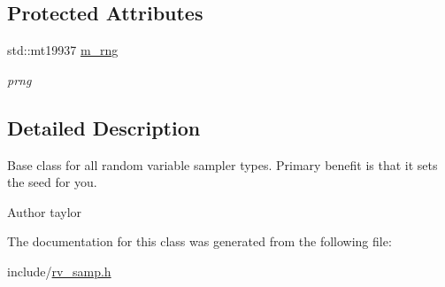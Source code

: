 \subsection*{Protected Attributes}
\begin{DoxyCompactItemize}
\item 
\mbox{\label{classrvsamp_1_1rvsamp__base_a40eb76e3ecd647c8b1e2d2ef21215dc7}} 
std\+::mt19937 \hyperlink{classrvsamp_1_1rvsamp__base_a40eb76e3ecd647c8b1e2d2ef21215dc7}{m\+\_\+rng}
\begin{DoxyCompactList}\small\item\em prng \end{DoxyCompactList}\end{DoxyCompactItemize}


\subsection{Detailed Description}
Base class for all random variable sampler types. Primary benefit is that it sets the seed for you. 

\begin{DoxyAuthor}{Author}
taylor 
\end{DoxyAuthor}


The documentation for this class was generated from the following file\+:\begin{DoxyCompactItemize}
\item 
include/\hyperlink{rv__samp_8h}{rv\+\_\+samp.\+h}\end{DoxyCompactItemize}
